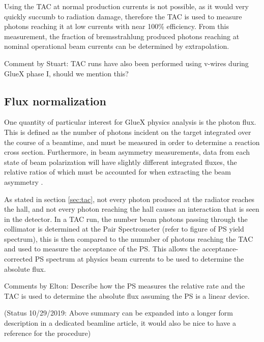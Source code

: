 Using the TAC at normal \GX{} production currents is not possible, as it would very quickly succumb to radiation damage, therefore the TAC is used to measure photons reaching it at low currents with near 100\% efficiency.
From this measurement, the fraction of bremsstrahlung produced photons reaching \GX{} at nominal operational beam currents can be determined by extrapolation.


{\color{red} Comment by Stuart: TAC runs have also been performed using v-wires during GlueX phase I, should we mention this?}


\subsection{Flux normalization \label{sec:fluxnorm}}
One quantity of particular interest for GlueX physics analysis is the photon flux.
This is defined as the number of photons incident on the target integrated over the course of a beamtime, and must be measured in order to determine a reaction cross section.
Furthermore, in beam asymmetry measurements, data from each state of beam polarization will have slightly different integrated fluxes, the relative ratios of which must be accounted for when extracting the beam asymmetry \cite{AlGhoul:2017nbp}.

As stated in section \ref{sec:tac}, not every photon produced at the radiator reaches the hall, and not every photon reaching the hall causes an interaction that is seen in the detector.
In a TAC run, the number beam photons passing through the collimator is determined at the Pair Spectrometer ({\color{red}refer to figure of PS yield spectrum}), this is then compared to the nummber of photons reaching the TAC and used to measure the acceptance of the PS.  This allows the acceptance-corrected PS spectrum at physics beam currents to be used to determine the absolute flux.

{\color{red} Comments by Elton: Describe how the PS measures the relative rate and the TAC is used to determine the absolute flux assuming the PS is a linear device.}

{\color{red}(Status 10/29/2019: Above summary can be expanded into a longer form description in a dedicated beamline article, it would also be nice to have a reference for the procedure)}